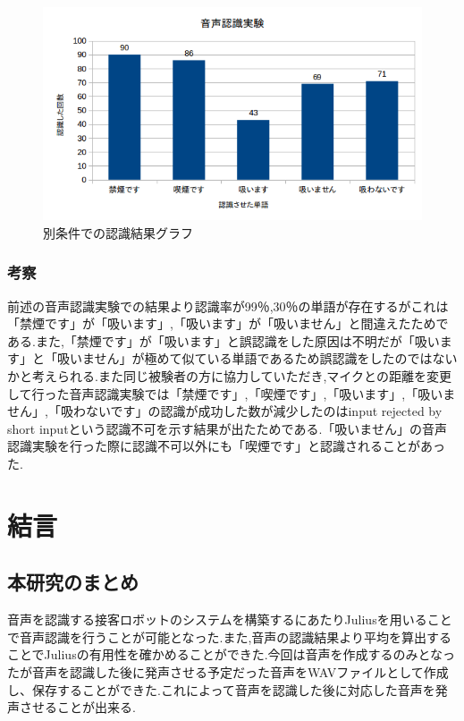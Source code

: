 \documentclass[12pt,oneside]{sotsuken_paper}
\begin{document}
\begin{figure}[htbp]
\begin{center}
\includegraphics[width=150mm]{img/result2.png}
\caption{別条件での認識結果グラフ}
\label{fig:result2}
\end{center}
\end{figure}


\subsection{考察}
前述の音声認識実験での結果より認識率が99％,30％の単語が存在するがこれは「禁煙です」が「吸います」,「吸います」が「吸いません」と間違えたためである.また,「禁煙です」が「吸います」と誤認識をした原因は不明だが「吸います」と「吸いません」が極めて似ている単語であるため誤認識をしたのではないかと考えられる.また同じ被験者の方に協力していただき,マイクとの距離を変更して行った音声認識実験では「禁煙です」,「喫煙です」,「吸います」,「吸いません」,「吸わないです」の認識が成功した数が減少したのはinput rejected by short inputという認識不可を示す結果が出たためである.「吸いません」の音声認識実験を行った際に認識不可以外にも「喫煙です」と認識されることがあった.


\chapter{結言}
\section{本研究のまとめ}
音声を認識する接客ロボットのシステムを構築するにあたりJuliusを用いることで音声認識を行うことが可能となった.また,音声の認識結果より平均を算出することでJuliusの有用性を確かめることができた.今回は音声を作成するのみとなったが音声を認識した後に発声させる予定だった音声をWAVファイルとして作成し、保存することができた.これによって音声を認識した後に対応した音声を発声させることが出来る.
\end{document}

